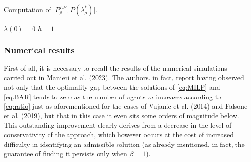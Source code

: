 \begin{algorithm}[H]
    \caption{Computation of [$P^{LP}_{\rho}$, $P(\lambda^*_{\rho})$].}
    \label{alg:2}

    \KwIn{$\rho$}
    
    $\lambda(0) = 0$\;
    $h = 1$\;
    
\end{algorithm}

\subsubsection{Numerical results}
First of all, it is necessary to recall the results of the numerical simulations carried out in Manieri et al. (2023)\supercite{manieri}. The authors, in fact, report having observed not only that the optimality gap between the solutions of \ref{eq:MILP} and \ref{eq:BAR} tends to zero as the number of agents $m$ increases according to \ref{eq:ratio} just as aforementioned for the cases of Vujanic et al. (2014)\supercite{vujanic} and Falsone et al. (2019)\supercite{falsone}, but that in this case it even sits some orders of magnitude below. This outstanding improvement clearly derives from a decrease in the level of conservativity of the approach, which however occurs at the cost of increased difficulty in identifying an admissible solution (as already mentioned, in fact, the guarantee of finding it persists only when $\beta=1$).

